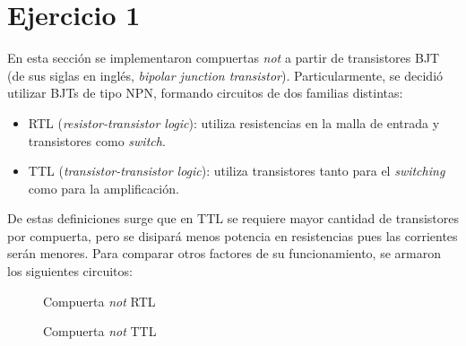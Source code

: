\documentclass[../../e3_tp2_main.tex]{subfiles}
\begin{document}
\section{Ejercicio 1}

En esta secci\'on se implementaron compuertas \textit{not} a partir de transistores BJT (de sus siglas en ingl\'es, \textit{bipolar junction transistor}). Particularmente, se decidi\'o utilizar BJTs de tipo NPN, formando circuitos de dos familias distintas:

\begin{itemize}
	\item RTL (\textit{resistor-transistor logic}): utiliza resistencias en la malla de entrada y transistores como \textit{switch}.
	\item TTL (\textit{transistor-transistor logic}): utiliza transistores tanto para el \textit{switching} como para la amplificaci\'on.
\end{itemize}

De estas definiciones surge que en TTL se requiere mayor cantidad de transistores por compuerta, pero se disipar\'a menos potencia en resistencias pues las corrientes ser\'an menores. Para comparar otros factores de su funcionamiento, se armaron los siguientes circuitos:

\begin{figure}[H]
	\centering
	\caption{Compuerta \textit{not} RTL}
	\label{fig:1-rtl}
\end{figure}

\begin{figure}[H]
	\centering
	\caption{Compuerta \textit{not} TTL}
	\label{fig:1-ttl}
\end{figure}
\end{document}
